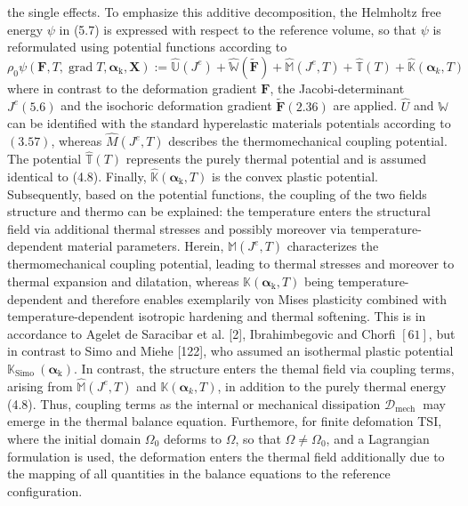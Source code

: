   the single effects. To emphasize this additive decomposition, the Helmholtz free energy \(\psi\) in (5.7) is expressed with respect to the reference volume, so that \(\psi\) is reformulated using potential functions according to
  \[
  \rho_{0} \psi\left(\boldsymbol{F}, T, \operatorname{grad} T, \boldsymbol{\alpha}_{\mathrm{k}}, \boldsymbol{X}\right):=\hat{\mathbb{U}}\left(J^{e}\right)+\hat{\mathbb{W}}(\tilde{\boldsymbol{F}})+\hat{\mathbb{M}}\left(J^{e}, T\right)+\hat{\mathbb{T}}(T)+\hat{\mathbb{K}}\left(\boldsymbol{\alpha}_{k}, T\right)
  \]
  where in contrast to the deformation gradient \(\boldsymbol{F}\), the Jacobi-determinant \(J^{e}(5.6)\) and the isochoric deformation gradient \(\tilde{\boldsymbol{F}}(2.36)\) are applied. \(\hat{U}\) and \(\mathbb{W}\) can be identified with the standard hyperelastic materials potentials according to \((3.57)\), whereas \(\hat{M}\left(J^{e}, T\right)\) describes the thermomechanical coupling potential. The potential \(\hat{\mathbb{T}}(T)\) represents the purely thermal potential and is assumed identical to (4.8). Finally, \(\hat{\mathbb{K}}\left(\boldsymbol{\alpha}_{\mathrm{k}}, T\right)\) is the convex plastic potential. Subsequently, based on the potential functions, the coupling of the two fields structure and thermo can be explained: the temperature enters the structural field via additional thermal stresses and possibly moreover via temperature-dependent material parameters. Herein, \(\mathbb{M}\left(J^{e}, T\right)\) characterizes the thermomechanical coupling potential, leading to thermal stresses and moreover to thermal expansion and dilatation, whereas \(\mathbb{K}\left(\boldsymbol{\alpha}_{\mathrm{k}}, T\right)\) being temperature-dependent and therefore enables exemplarily von Mises plasticity combined with temperature-dependent isotropic hardening and thermal softening. This is in accordance to Agelet de Saracibar et al. [2], Ibrahimbegovic and Chorfi \([61]\), but in contrast to Simo and Miehe [122], who assumed an isothermal plastic potential \(\mathbb{K}_{\text {Simo }}\left(\boldsymbol{\alpha}_{\mathrm{k}}\right)\). In contrast, the structure enters the themal field via coupling terms, arising from \(\hat{\mathbb{M}}\left(J^{e}, T\right)\) and \(\mathbb{K}\left(\boldsymbol{\alpha}_{k}, T\right)\), in addition to the purely thermal energy (4.8). Thus, coupling terms as the internal or mechanical dissipation \(\mathcal{D}_{\text {mech }}\) may emerge in the thermal balance equation. Furthemore, for finite defomation TSI, where the initial domain \(\Omega_{0}\) deforms to \(\Omega\), so that \(\Omega \neq \Omega_{0}\), and a Lagrangian formulation is used, the deformation enters the thermal field additionally due to the mapping of all quantities in the balance equations to the reference configuration.

